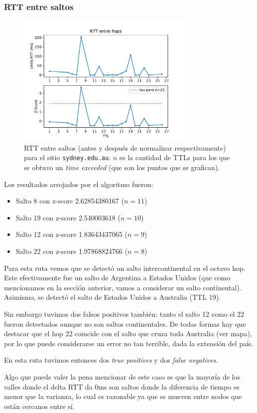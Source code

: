 \subsubsection*{RTT entre saltos}

\begin{figure}[H]
  \centering
  \includegraphics[width=8.5cm]{figs/traceroute-sidney.pdf}
  \caption{\footnotesize RTT entre saltos (antes y después de normalizar respectivamente) para el sitio \texttt{sydney.edu.au}. $n$ es la cantidad de TTLs para los que se obtuvo un \emph{time exceeded} (que son los puntos que se grafican).}
\end{figure}

Los resultados arrojados por el algoritmo fueron:

\begin{itemize}
  \item Salto 8 con z-score 2.62854380167 ($n=11$)
  \item Salto 19 con z-score 2.540003618 ($n=10$)
  \item Salto 12 con z-score 1.83643437065 ($n=9$)
  \item Salto 22 con z-score 1.97868824766 ($n=8$)
\end{itemize}

Para esta ruta vemos que se detectó un salto intercontinental en el octavo hop. Este efectivamente fue un salto de Argentina a Estados Unidos (que como mencionamos en la sección anterior, vamos a considerar un salto continental). Asimismo, se detectó el salto de Estados Unidos a Australia (TTL 19).

Sin embargo tuvimos dos falsos positivos también: tanto el salto 12 como el 22 fueron detectados aunque no son saltos continentales. De todas formas hay que destacar que el hop 22 coincide con el salto que cruza toda Australia (ver mapa), por lo que puede considerarse un error no tan terrible, dada la extensión del país.

En esta ruta tuvimos entonces dos \emph{true positives} y dos \emph{false negatives}.

Algo que puede valer la pena mencionar de este caso es que la mayoría de los valles donde el delta RTT da 0ms son saltos donde la diferencia de tiempo es menor que la varianza, lo cual es razonable ya que se mueven entre nodos que están cercanos entre sí.
